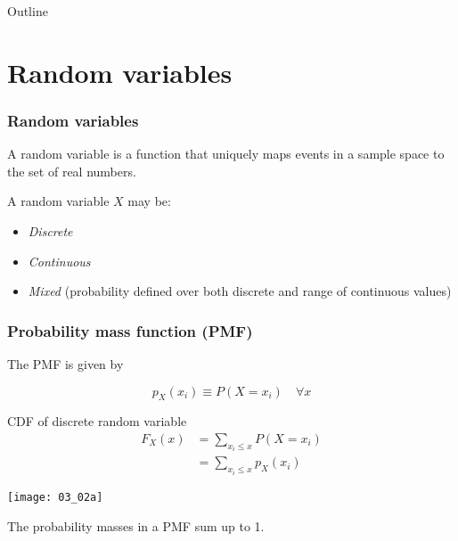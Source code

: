 \documentclass[usenames,dvipsnames,smaller%
]{beamer}
\newcommand{\?}{\stackrel{?}{=}}
\begin{document}

  


\begin{frame}{Outline}
  \tableofcontents
\end{frame}
 

 

 \section{Random variables}
 \begin{frame}
  \frametitle{Random variables}\pause

  A random variable is a function that uniquely maps events in a sample space to the set of real numbers. \\ \pause

  \bigskip
  
  A random variable $X$ may be: \pause

  \bigskip
  
  \begin{itemize}
  \item {\it Discrete}
  \item {\it Continuous}
  \item {\it Mixed} (probability defined over both discrete and range of continuous values)
  \end{itemize}
  
\end{frame}
 

 \begin{frame}
  \frametitle{Probability mass function (PMF)}\pause
  \begin{minipage}{.45\linewidth}
  The PMF is given by \pause

  \begin{equation}
    \label{eq:12}
    p_X(x_i) \equiv P(X = x_i) \quad \forall x
  \end{equation}

  \pause
  
  \begin{alertblock}{CDF of discrete random variable}
    \pause
    \begin{align*}
      \label{eq:14}
      F_X(x) &= \sum_{x_i \le x} P(X = x_i)\\
             &= \sum_{x_i \le x}p_X(x_i)
    \end{align*}
  \end{alertblock}
  \end{minipage}\qquad \pause
  \begin{minipage}{.45\linewidth}
    \texttt{[image: 03\_02a]}
  \end{minipage}
  
  \pause

  \bigskip
  
  The probability masses in a PMF sum up to 1.
\end{frame}
\end{document}
